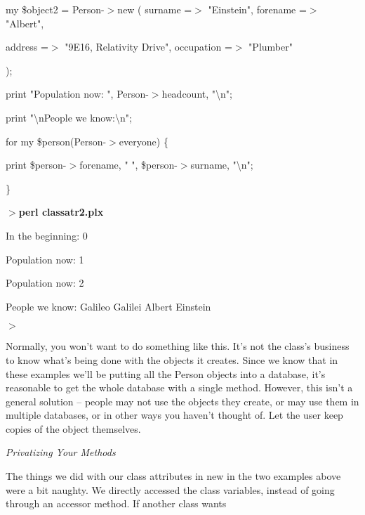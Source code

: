 \documentclass[a4paper,11pt]{book}
\begin{document}
\noindent 

\noindent my \$object2 = Person-$>$new ( surname =$>$ "Einstein", forename =$>$ "Albert",

\noindent 

\noindent address =$>$ "9E16, Relativity Drive", occupation =$>$ "Plumber"

\noindent );

\noindent 

\noindent 

\noindent print "Population now: ", Person-$>$headcount, "\textbackslash n";

\noindent 

\noindent print "\textbackslash nPeople we know:\textbackslash n";

\noindent for my \$person(Person-$>$everyone) \{

\noindent print \$person-$>$forename, " ", \$person-$>$surname, "\textbackslash n";

\noindent \}

\noindent 

\noindent $>$\textbf{perl classatr2.plx}

\noindent In the beginning: 0

\noindent Population now: 1

\noindent Population now: 2

\noindent 

\noindent People we know: Galileo Galilei Albert Einstein

\noindent $>$

\noindent 

\noindent Normally, you won't want to do something like this. It's not the class's business to know what's being done with the objects it creates. Since we know that in these examples we'll be putting all the Person objects into a database, it's reasonable to get the whole database with a single method. However, this isn't a general solution -- people may not use the objects they create, or may use them in multiple databases, or in other ways you haven't thought of. Let the user keep copies of the object themselves.

\noindent 

\noindent \textit{Privatizing Your Methods}

\noindent The things we did with our class attributes in new in the two examples above were a bit naughty. We directly accessed the class variables, instead of going through an accessor method. If another class wants
\end{document}
